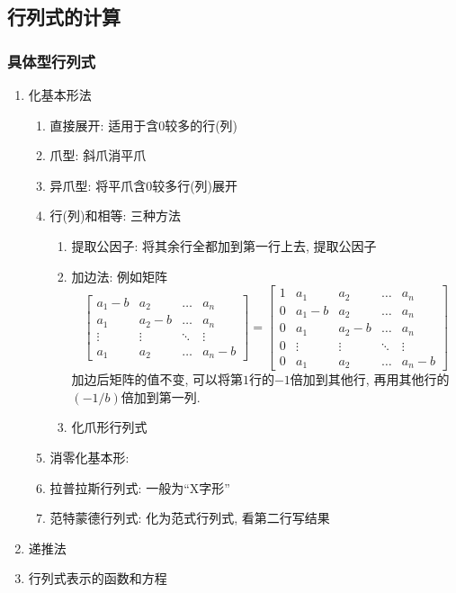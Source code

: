 \subsection{行列式的计算}
\subsubsection{具体型行列式}
\begin{enumerate}
\item 化基本形法
\begin{enumerate}
\item 直接展开: 适用于含$ 0 $较多的行(列)
\item 爪型: 斜爪消平爪
\item 异爪型: 将平爪含$ 0 $较多行(列)展开
\item 行(列)和相等: 三种方法
\begin{enumerate}
\item 提取公因子: 将其余行全都加到第一行上去, 提取公因子
\item 加边法: 例如矩阵
\begin{equation*}
\begin{bmatrix}
a_{1}-b & a_{2} & \dots & a_{n} \\
a_{1} & a_{2}-b & \dots & a_{n} \\
\vdots & \vdots & \ddots & \vdots \\
a_{1} & a_{2} & \dots & a_{n}-b
\end{bmatrix}=
\begin{bmatrix}
1 & a_{1} & a_{2} & \dots & a_{n} \\
0 & a_{1}-b & a_{2} & \dots & a_{n} \\
0 & a_{1} & a_{2}-b & \dots & a_{n} \\
0 & \vdots & \vdots & \ddots & \vdots \\
0 & a_{1} & a_{2} & \dots & a_{n}-b
\end{bmatrix}
\end{equation*}加边后矩阵的值不变, 可以将第$ 1 $行的$ -1 $倍加到其他行, 再用其他行的$ (-1/b) $倍加到第一列.
\item 化爪形行列式
\end{enumerate}
\item 消零化基本形: 
\item 拉普拉斯行列式: 一般为``X字形''
\item 范特蒙德行列式: 化为范式行列式, 看第二行写结果
\end{enumerate}
\item 递推法
\item 行列式表示的函数和方程
\end{enumerate}
